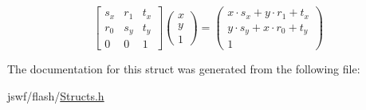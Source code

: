 \[ \begin{bmatrix} s_x & r_1 & t_x \\ r_0 & s_y & t_y \\ 0 & 0 & 1 \end{bmatrix} \begin{pmatrix}x\\y\\1\end{pmatrix} = \begin{pmatrix} x \cdot s_x + y \cdot r_1 + t_x \\ y \cdot s_y + x \cdot r_0 + t_y \\ 1 \end{pmatrix} \] 

The documentation for this struct was generated from the following file\+:\begin{DoxyCompactItemize}
\item 
jswf/flash/\hyperlink{_structs_8h}{Structs.\+h}\end{DoxyCompactItemize}
